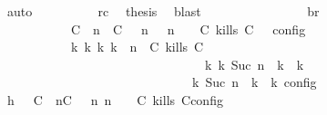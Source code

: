 \begin{isabellebody}
\ auto\isanewline
\ \ \ \ \ \ \ \ \isamarkupfalse%
\ rc\ \isamarkupfalse%
\ {\isacharquery}thesis\ \isamarkupfalse%
\ blast\isanewline
\ \ \ \ \ \ \isamarkupfalse%
\isanewline
\ \ \ \ \ \ \isamarkupfalse%
\ \isamarkupfalse%
\ br{}{\isacharcolon}\isanewline
\ \ \ \ \ \ \ \ {\isacartoucheopen}{\isasymrho}\ {\isasymin}\ {\isasymlbrakk}\ {\isacharparenleft}{\isacharparenleft}C\ {\isasymUp}\ n{\isacharparenright}\ {\isacharhash}\ {\isacharparenleft}C\ {\isasymnot}{\isasymUp}\ {\isasymge}\ n{\isacharparenright}\ {\isacharhash}\ {\isasymGamma}{\isacharparenright}{\isacharcomma}\ n\ {\isasymturnstile}\ {\isasymPsi}\ {\isasymtriangleright}\ {\isacharparenleft}{\isacharparenleft}C\ kills\ C\ {\isacharhash}\ {\isasymPhi}{\isacharparenright}\ {\isasymrbrakk}\isactrlsub c\isactrlsub o\isactrlsub n\isactrlsub f\isactrlsub i\isactrlsub g\isanewline
\ \ \ \ \ \ \ \ \ \ {\isasymLongrightarrow}\ {\isasymexists}{\isasymGamma}\isactrlsub k\ {\isasymPsi}\isactrlsub k\ {\isasymPhi}\isactrlsub k\ k{\isachardot}\ {\isacharparenleft}{\isacharparenleft}{\isasymGamma}{\isacharcomma}\ n\ {\isasymturnstile}\ {\isacharparenleft}{\isacharparenleft}C\ kills\ C\ {\isacharhash}\ {\isasymPsi}{\isacharparenright}\ {\isasymtriangleright}\ {\isasymPhi}{\isacharparenright}\isanewline
\ \ \ \ \ \ \ \ \ \ \ \ \ \ \ \ \ \ \ \ \ \ \ \ \ \ \ \ \ \ \ \ {\isasymhookrightarrow}\isactrlbsup k\isactrlesup \ {\isacharparenleft}{\isasymGamma}\isactrlsub k{\isacharcomma}\ Suc\ n\ {\isasymturnstile}\ {\isasymPsi}\isactrlsub k\ {\isasymtriangleright}\ {\isasymPhi}\isactrlsub k{\isacharparenright}{\isacharparenright}\isanewline
\ \ \ \ \ \ \ \ \ \ \ \ \ \ \ \ \ \ \ \ \ \ \ \ \ \ {\isasymand}\ {\isasymrho}\ {\isasymin}\ {\isasymlbrakk}\ {\isasymGamma}\isactrlsub k{\isacharcomma}\ Suc\ n\ {\isasymturnstile}\ {\isasymPsi}\isactrlsub k\ {\isasymtriangleright}\ {\isasymPhi}\isactrlsub k\ {\isasymrbrakk}\isactrlsub c\isactrlsub o\isactrlsub n\isactrlsub f\isactrlsub i\isactrlsub g{\isacartoucheclose}\isanewline
\ \ \ \ \ \ \isamarkupfalse%
\ {\isacharminus}\isanewline
\ \ \ \ \ \ \ \ \isamarkupfalse%
\ h{}{\isacharcolon}\ {\isacartoucheopen}{\isasymrho}\ {\isasymin}\ {\isasymlbrakk}{\isacharparenleft}{\isacharparenleft}C\ {\isasymUp}\ n{\isacharparenright}{\isacharhash}{\isacharparenleft}C\ {\isasymnot}{\isasymUp}\ {\isasymge}\ n{\isacharparenright}{\isacharhash}{\isasymGamma}{\isacharparenright}{\isacharcomma}\ n\ {\isasymturnstile}\ {\isasymPsi}\ {\isasymtriangleright}\ {\isacharparenleft}{\isacharparenleft}C\ kills\ C\isactrlsub c\isactrlsub o\isactrlsub n\isactrlsub f\isactrlsub i\isactrlsub g{\isacartoucheclose}\isanewline

\end{isabellebody}
